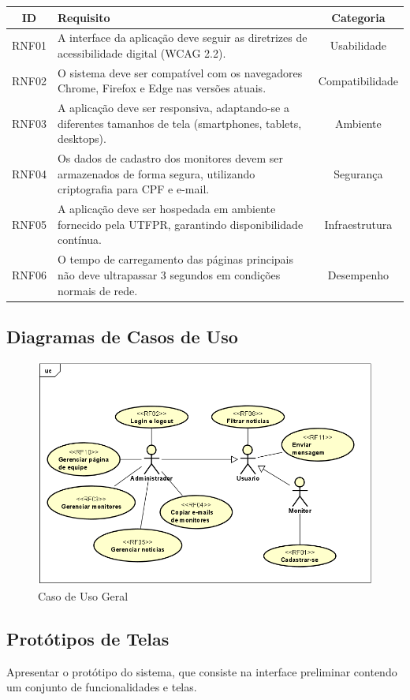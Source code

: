 \documentclass[a4paper,12pt]{article}
\begin{document}
\begin{longtable}{|c|p{10cm}|c|}
    \hline
    \textbf{ID} & \textbf{Requisito} & \textbf{Categoria} \\
    \hline
    RNF01 & A interface da aplicação deve seguir as diretrizes de acessibilidade digital (WCAG 2.2). & Usabilidade \\
    \hline
    RNF02 & O sistema deve ser compatível com os navegadores Chrome, Firefox e Edge nas versões atuais. & Compatibilidade \\
    \hline
    RNF03 & A aplicação deve ser responsiva, adaptando-se a diferentes tamanhos de tela (smartphones, tablets, desktops). & Ambiente \\
    \hline
    RNF04 & Os dados de cadastro dos monitores devem ser armazenados de forma segura, utilizando criptografia para CPF e e-mail. & Segurança \\
    \hline
    RNF05 & A aplicação deve ser hospedada em ambiente fornecido pela UTFPR, garantindo disponibilidade contínua. & Infraestrutura \\
    \hline
    RNF06 & O tempo de carregamento das páginas principais não deve ultrapassar 3 segundos em condições normais de rede. & Desempenho \\
    \hline
\end{longtable}


\subsection{Diagramas de Casos de Uso}
\begin{figure}
    \centering
    \includegraphics[width=0.75\linewidth]{caso_de_usoGeral.png}
    \caption{Caso de Uso Geral}
    \label{fig:enter-label}
\end{figure}

\clearpage

\subsection{Protótipos de Telas}
Apresentar o protótipo do sistema, que consiste na interface preliminar contendo um conjunto de funcionalidades e telas. 
\end{document}
